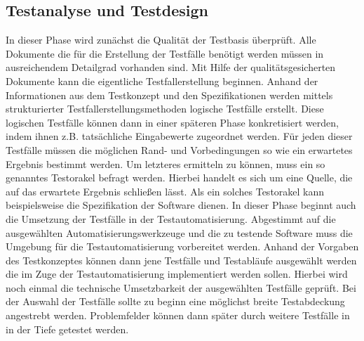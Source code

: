 \subsection{Testanalyse und Testdesign}
\label{subsec:testanalyse_und_design}
In dieser Phase wird zunächst die Qualität der Testbasis überprüft. Alle Dokumente die für die Erstellung der Testfälle benötigt werden müssen in ausreichendem Detailgrad vorhanden sind. Mit Hilfe der qualitätsgesicherten Dokumente kann die eigentliche Testfallerstellung beginnen.
Anhand der Informationen aus dem Testkonzept und den Spezifikationen werden mittels strukturierter Testfallerstellungsmethoden logische Testfälle erstellt. Diese logischen Testfälle können dann in einer späteren Phase konkretisiert werden, indem ihnen z.B. tatsächliche Eingabewerte zugeordnet werden. Für jeden dieser Testfälle müssen die möglichen Rand- und Vorbedingungen so wie ein erwartetes Ergebnis bestimmt werden. Um letzteres ermitteln zu können, muss ein so genanntes Testorakel befragt werden. Hierbei handelt es sich um eine Quelle, die auf das erwartete Ergebnis schließen lässt. Als ein solches Testorakel kann beispielsweise die Spezifikation der Software dienen.
In dieser Phase beginnt auch die Umsetzung der Testfälle in der Testautomatisierung.
Abgestimmt auf die ausgewählten Automatisierungswerkzeuge und die zu testende Software  muss die Umgebung für die Testautomatisierung vorbereitet werden. Anhand der Vorgaben des Testkonzeptes können dann jene Testfälle und Testabläufe ausgewählt werden die im Zuge der Testautomatisierung implementiert werden sollen. Hierbei wird noch einmal die technische Umsetzbarkeit der ausgewählten Testfälle geprüft. Bei der Auswahl der Testfälle sollte zu beginn eine möglichst breite Testabdeckung angestrebt werden.
Problemfelder können dann später durch weitere Testfälle in in der Tiefe getestet werden.

